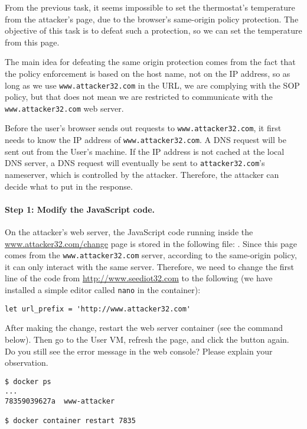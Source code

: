 From the previous task, it seems impossible to
set the thermostat's temperature from the attacker's
page, due to the browser's   
same-origin policy protection.  The objective of this task
is to defeat such a protection, so we can set the 
temperature from this page. 


The main idea for defeating the same origin protection 
comes from the fact that the policy enforcement is 
based on the host name, not on the IP address, so as long as 
we use \texttt{www.attacker32.com} in the URL, we are complying with
the SOP policy, but that does not mean we are restricted 
to communicate with the \texttt{www.attacker32.com} web server.  


Before the user's browser sends out requests to \texttt{www.attacker32.com},
it first needs to know the IP address of \texttt{www.attacker32.com}. 
A DNS request will be sent out from the User's machine. If the 
IP address is not cached at the local DNS server, a DNS request will
eventually be sent to \texttt{attacker32.com}'s  nameserver, which 
is controlled by the attacker. 
Therefore, the attacker can decide what to put in the response. 


\paragraph{Step 1: Modify the JavaScript code.}
On the attacker's web server, the JavaScript code running inside the 
\url{www.attacker32.com/change} page is 
stored in the following file: 
. Since this page
comes from the \texttt{www.attacker32.com} server, 
according to the same-origin policy, it can only
interact with the same server. Therefore, we need to change the first 
line of the code from \url{http://www.seediot32.com} 
to the following (we have installed a simple editor called \texttt{nano}
in the container):

\begin{lstlisting}
let url_prefix = 'http://www.attacker32.com'
\end{lstlisting}
 

After making the change, restart the web server container (see the 
command below). Then go to the User VM, refresh the page, and click the button again. 
Do you still see the error
message in the web console? Please explain your observation. 


\begin{lstlisting}
$ docker ps
...
78359039627a  www-attacker

$ docker container restart 7835
\end{lstlisting}
 


